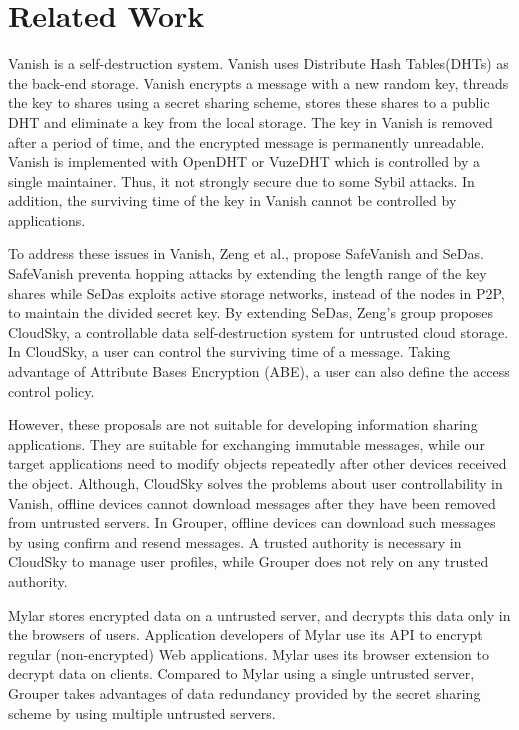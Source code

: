 \documentclass[twocolumn,10pt]{article}
\begin{document}
\section{Related Work}

Vanish is a self-destruction system\cite{geambasu2009vanish}. 
Vanish uses Distribute Hash Tables(DHTs) as the back-end storage.
Vanish encrypts a message with a new random key, threads the key to shares using a secret sharing scheme, stores these shares to a public DHT and eliminate a key from the local storage.
The key in Vanish is removed after a period of time, and the encrypted message is permanently unreadable.
Vanish is implemented with OpenDHT\cite{rhea2005opendht} or VuzeDHT\cite{vuzedht} which is controlled by a single maintainer. 
Thus, it not strongly secure due to some Sybil attacks\cite{wolchok2010defeating}. 
In addition, the surviving time of the key in Vanish cannot be controlled by applications. 

To address these issues in Vanish, Zeng et al., propose SafeVanish\cite{zeng2010safevanish} and SeDas\cite{zeng2012sedas}. 
SafeVanish preventa hopping attacks by extending the length range of the key shares while SeDas exploits active storage networks, instead of the nodes in P2P, to maintain the divided secret key. By extending SeDas, Zeng's group proposes CloudSky\cite{zeng2015cloudsky}, a controllable data self-destruction system for untrusted cloud storage. 
In CloudSky, a user can control the surviving time of a message.
Taking advantage of Attribute Bases Encryption (ABE), a user can also define the access control policy.

However, these proposals are not suitable for developing information sharing applications. 
They are suitable for exchanging immutable messages, while our target applications need to modify objects repeatedly after other devices received the object. 
Although, CloudSky solves the problems about user controllability in Vanish, offline devices cannot download messages after they have been removed from untrusted servers.
In Grouper, offline devices can download such messages by using confirm and resend messages.
A trusted authority is necessary in CloudSky to manage user profiles, while Grouper does not rely on any trusted authority.

Mylar\cite{popa2014building} stores encrypted data on a untrusted server, and decrypts this data only in the browsers of users. 
Application developers of Mylar use its API to encrypt regular (non-encrypted) Web applications. 
Mylar uses its browser extension to decrypt data on clients. 
Compared to Mylar using a single untrusted server, Grouper takes advantages of data redundancy provided by the secret sharing scheme by using multiple untrusted servers.
\end{document}
